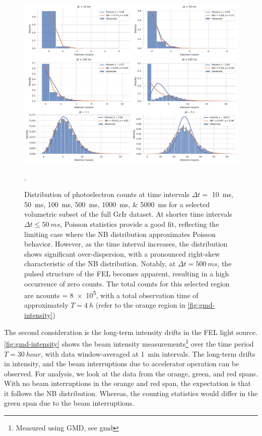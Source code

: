 \begin{figure}
    \centering
    \includegraphics[width=1\linewidth]{images/hist_counts_facetgrid_1_grir.pdf}
    \caption{Distribution of photoelectron counts at time intervals $\Delta t =$ \qtylist{10;50;100;500;1000;5000}{ms} for a selected volumetric subset of the full \gls{GrIr} dataset. At shorter time intervals $\Delta t \leq \qty{50}{ms}$, Poisson statistics provide a good fit, reflecting the limiting case where the \gls{NB} distribution approximates Poisson behavior. However, as the time interval increases, the distribution shows significant over-dispersion, with a pronounced right-skew characteristic of the \gls{NB} distribution. Notably, at $\Delta t = \qty{500}{ms}$, the pulsed structure of the \gls{FEL} becomes apparent, resulting in a high occurrence of zero counts. The total counts for this selected region are \gls{ncounts} = \num{8e5}, with a total observation time of approximately $T = \qty{4}{h}$ (refer to the orange region in \cref{fig:gmd-intensity})}.
    \label{fig:grir-stats-1}
\end{figure}


The second consideration is the long-term intensity drifts in the \gls{FEL} light source. \cref{fig:gmd-intensity} shows the beam intensity measurements\footnote{Measured using \gls{GMD}, see \gls{gmd}} over the time period $T=\qty{30}{hour}$, with data window-averaged at \qty{1}{min} intervals. The long-term drifts in intensity, and the beam interruptions due to accelerator operation can be observed. For analysis, we look at the data from the orange, green, and red spans. With no beam interruptions in the orange and red span, the expectation is that it follows the \gls{NB} distribution. Whereas, the counting statistics would differ in the green span due to the beam interruptions.


